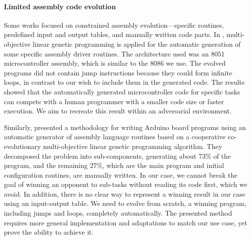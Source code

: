 \documentclass[dvipsnames, format=sigconf]{acmart}
\begin{document}
\paragraph{Limited assembly code evolution}
Some works focused on constrained assembly evolution---specific routines, predefined input and output tables, and manually written code parts.
In \cite{Serruto2017Automatic}, multi-objective linear genetic programming is applied for the automatic generation of some specific assembly driver routines. %
The architecture used was an 8051 microcontroller assembly, which is similar to the 8086 we use. The evolved programs did not contain jump instructions because they could form infinite loops, in contrast to our wish to include them in the generated code. %
The results showed that the automatically generated microcontroller code for specific tasks can compete with a human programmer with a smaller code size or faster execution. We aim to recreate this result within an adversarial environment.

Similarly, \cite{Ferrel2020Genetic} presented a methodology for writing Arduino board programs using an automatic generator of assembly language routines based on a cooperative co-evolutionary multi-objective linear genetic programming algorithm. They decomposed the problem into sub-components, generating about 73\% of the program, and the remaining 27\%, which are the main program and initial configuration routines, are manually written.%
In our case, we cannot break the goal of winning an opponent to sub-tasks without reading its code first, which we avoid. In addition, there is no clear way to represent a winning result in our case using an input-output table. We need to evolve from scratch, a winning program, including jumps and loops, completely automatically. The presented method~\cite{Ferrel2020Genetic} requires more general implementation and adaptations to match our use case, yet prove the ability to achieve it.
\end{document}
